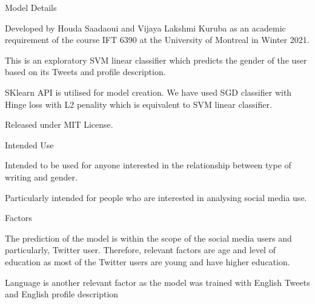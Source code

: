 \documentclass{article}
\begin{document}
 \begin{adjustwidth}{-60pt}{-30pt}
 \begin{singlespace}
 
 \begin{tcolorbox}[title=\textbf{Model Card - Tweeter Gender Classification },
     breakable, sharp corners, boxrule=0.7pt]
 
 \small{
 
 \begin{multicols}{2}
 \begin{mcsection}{Model Details}
    \item Developed by Houda Saadaoui and  Vijaya Lakshmi Kuruba as an academic requirement of the course IFT 6390 at the University of Montreal in Winter 2021.
     \item  This is an exploratory SVM linear classifier which predicts the gender of the user based on its Tweets and profile description.  
     \item SKlearn API is utilised for model creation. We have used SGD classifier with Hinge loss with L2 penality which is equivalent to SVM linear classifier.
     \item Released under MIT License.

 \end{mcsection}
 
 \begin{mcsection}{Intended Use}
     \item Intended to be used for anyone interested  in the relationship between type of writing and gender. 
     \item Particularly intended for people who are interested in analysing social media use.
  

 \end{mcsection}
 
 \begin{mcsection}{Factors}
     \item The prediction of the model is within the scope of the social media users and particularly, Twitter user. 
     Therefore, relevant factors are age and level of education as most of the Twitter users are young and have higher education.
    \item Language is another relevant factor as the model was trained with English Tweets and English profile description


\end{mcsection}
\end{multicols}}
\end{tcolorbox}
\end{singlespace}
\end{adjustwidth}
\end{document}
